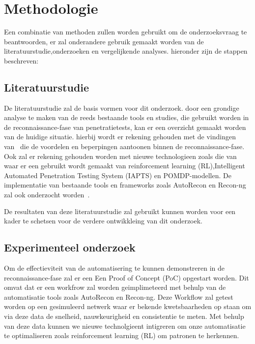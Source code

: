 
\section{Methodologie}%
\label{sec:methodologie}


Een combinatie van methoden zullen worden gebruikt om de onderzoeksvraag te beantwoorden, er zal onderandere gebruik 
gemaakt worden van de literatuurstudie,onderzoeken en vergelijkende analyses. hieronder zijn de stappen beschreven:

\subsection{Literatuurstudie}

De literatuurstudie zal de basis vormen voor dit onderzoek. door een grondige analyse te maken van de reeds bestaande tools en studies,
die gebruikt worden in de reconnaissance-fase van penetratietests, kan er een overzicht gemaakt worden van de huidige situatie.
hierbij wordt er rekening gehouden met de vindingen van~\textcite{Shah,Kothia} die de voordelen en beperpingen aantoonen binnen de reconnaissance-fase.
Ook zal er rekening gehouden worden met nieuwe technologieen zoals die van ~\textcite{Ghanem,Hoang} waar er een gebruikt wordt gemaakt van
reinforcement learning (RL),Intelligent Automated Penetration Testing System (IAPTS) en POMDP-modellen. De implementatie van bestaande 
tools en frameworks zoals AutoRecon en Recon-ng zal ook onderzocht worden~\autocite{Shebli}.

De resultaten van deze literatuurstudie zal gebruikt kunnen worden voor een kader te schetsen voor de verdere ontwikkleing van dit onderzoek.

\subsection{Experimenteel onderzoek}

Om de effectieviteit van de automatisering te kunnen demonstreren in de reconnaissance-fase zal er een Een Proof of Concept (PoC) opgestart worden. 
Dit omvat dat er een workfrow zal worden geimplimeteerd met behulp van de automatisatie tools zoals AutoRecon en Recon-ng. Deze 
Workflow zal getest worden op een gesimuleerd netwerk waar er bekende kwetsbaarheden op staan om via deze data de snelheid, 
nauwkeurigheid en consistentie te meten. Met behulp van deze data kunnen we nieuwe technolgieent intigreren om onze automatisatie te optimaliseren
zoals reinforcement learning (RL) om patronen te herkennen.

